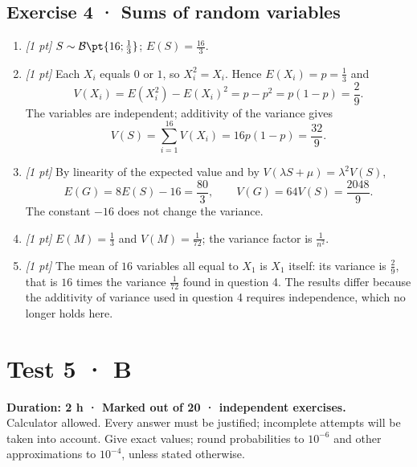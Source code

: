 \subsection*{Exercise 4 · Sums of random variables}\begin{enumerate}

\item \textit{[1 pt]} $S\sim\mathcal B\pt{16;\frac{1}{3}}$; $E(S)=\frac{16}{3}$.

\item \textit{[1 pt]} Each $X_i$ equals $0$ or $1$, so $X_i^2=X_i$. Hence $E(X_i)=p=\frac{1}{3}$ and
\[V(X_i)=E(X_i^2)-E(X_i)^2=p-p^2=p(1-p)=\frac{2}{9}.\]
The variables are independent; additivity of the variance gives
\[V(S)=\sum_{i=1}^{16}V(X_i)=16p(1-p)=\frac{32}{9}.\]

\item \textit{[1 pt]} By linearity of the expected value and by $V(\lambda S+\mu)=\lambda^2V(S)$,
\[E(G)=8E(S)-16=\frac{80}{3},\qquad V(G)=64V(S)=\frac{2048}{9}.\]
The constant $-16$ does not change the variance.

\item \textit{[1 pt]} $E(M)=\frac{1}{3}$ and $V(M)=\frac{1}{72}$; the variance factor is $\frac{1}{n^2}$.

\item \textit{[1 pt]} The mean of $16$ variables all equal to $X_1$ is $X_1$ itself: its variance is $\frac{2}{9}$, that is $16$ times the variance $\frac{1}{72}$ found in question 4. The results differ because the additivity of variance used in question 4 requires independence, which no longer holds here.

\end{enumerate}

\fi

\fi

\ifmxteacher

\mxnewpage{}\label{sujet:7-4}

\section*{Test 5 · B}


\textbf{Duration: 2 h · Marked out of 20 ·  independent exercises.}\\Calculator allowed. Every answer must be justified; incomplete attempts will be taken into account. Give exact values; round probabilities to $10^{-6}$ and other approximations to $10^{-4}$, unless stated otherwise.

